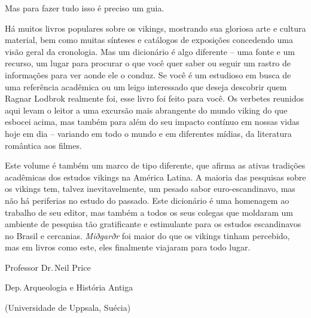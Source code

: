 Mas para fazer tudo isso é preciso um guia.

Há muitos livros populares sobre os vikings, mostrando sua gloriosa arte
e cultura material, bem como muitas sínteses e catálogos de exposições
concedendo uma visão geral da cronologia. Mas um dicionário é algo
diferente -- uma fonte e um recurso, um lugar para procurar o que você
quer saber ou seguir um rastro de informações para ver aonde ele o conduz.
Se você é um estudioso em busca de uma referência acadêmica ou um leigo
interessado que deseja descobrir quem Ragnar Lodbrok realmente foi, esse
livro foi feito para você. Os verbetes reunidos aqui levam o leitor a
uma excursão mais abrangente do mundo viking do que esbocei acima, mas
também para além do seu impacto contínuo em nossas vidas hoje em dia --
variando em todo o mundo e em diferentes mídias, da literatura romântica
aos filmes.

Este volume é também um marco de tipo diferente, que afirma as ativas
tradições acadêmicas dos estudos vikings na América Latina. A maioria das pesquisas sobre os vikings tem, talvez inevitavelmente, um pesado sabor euro-escandinavo, mas não há periferias no estudo do passado. Este
dicionário é uma homenagem ao trabalho de seu editor, mas também a todos os seus colegas que moldaram um ambiente de pesquisa tão gratificante e estimulante para os
estudos escandinavos no Brasil e cercanias. \emph{Miðgarðr} foi maior do
que os vikings tinham percebido, mas em livros como este, eles
finalmente viajaram para todo lugar.\medskip

\EP[2]
\hfill Professor Dr.\,Neil Price

\hfill Dep.\,Arqueologia e História Antiga 

\hfill (Universidade de Uppsala, Suécia)
